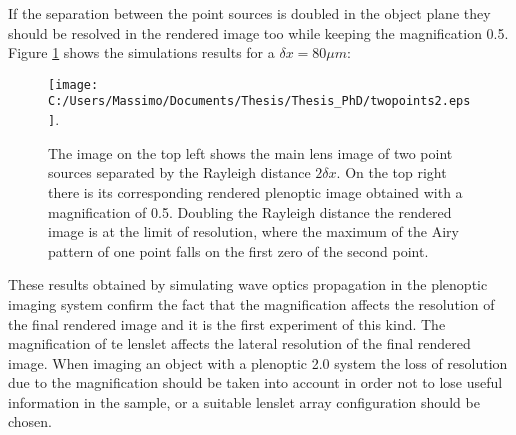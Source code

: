 If the separation between the point sources is doubled in the object plane they should be resolved in the rendered image too while keeping the magnification 0.5. Figure \ref{fig:twopoint2} shows the simulations results for a $\delta x = 80 \mu m$:
\begin{figure}[H]
	\centering
	\texttt{[image: C:/Users/Massimo/Documents/Thesis/Thesis\_PhD/twopoints2.eps]}.
	\caption{\label{fig:twopoint2} The image on the top left shows  the main lens image of two point sources separated by the Rayleigh distance $2\delta x$. On the top right there is its corresponding rendered plenoptic image obtained with a magnification of 0.5. Doubling the Rayleigh distance the rendered image is at the limit of resolution, where the maximum of the Airy pattern of one point falls on the first zero of the second point. }
\end{figure}
These results obtained by simulating wave optics propagation in the plenoptic imaging system confirm the fact that the magnification affects the resolution of the final rendered image and it is the first experiment of this kind. The magnification of te lenslet affects the lateral resolution of the final rendered image. When imaging an object with a plenoptic 2.0 system the loss of resolution due to the magnification should be taken into account in order not to lose useful information in the sample, or a suitable lenslet array configuration should be chosen.
